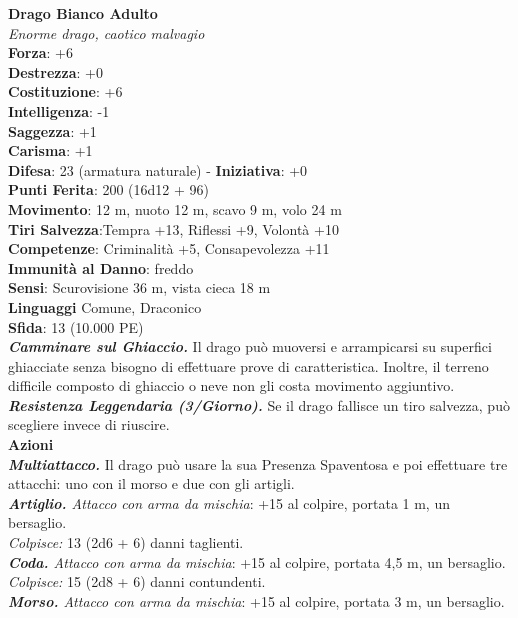 \begin{multicols}{2}
\medskip\textbf{Drago Bianco Adulto}\\
\emph{Enorme drago, caotico malvagio}\\
\textbf{Forza}: +6\\
\textbf{Destrezza}: +0\\
\textbf{Costituzione}: +6\\
\textbf{Intelligenza}: -1\\
\textbf{Saggezza}: +1\\
\textbf{Carisma}: +1\\
\textbf{Difesa}: 23 (armatura naturale) - \textbf{Iniziativa}: +0\\
\textbf{Punti Ferita}: 200 (16d12 + 96)\\
\textbf{Movimento}: 12 m, nuoto 12 m, scavo 9 m, volo 24 m\\
\textbf{Tiri Salvezza}:Tempra +13, Riflessi +9, Volontà +10\\
\textbf{Competenze}: Criminalità +5, Consapevolezza +11\\
\textbf{Immunità al Danno}: freddo\\
\textbf{Sensi}: Scurovisione 36 m, vista cieca 18 m\\
\textbf{Linguaggi} Comune, Draconico\\
\textbf{Sfida}: 13 (10.000 PE)\smallskip\\
\emph{\textbf{Camminare sul Ghiaccio.}} Il drago può muoversi e arrampicarsi su superfici ghiacciate senza bisogno di effettuare prove di caratteristica. Inoltre, il terreno difficile composto di ghiaccio o neve non gli costa movimento aggiuntivo.\\
\emph{\textbf{Resistenza Leggendaria (3/Giorno).}} Se il drago fallisce un tiro salvezza, può scegliere invece di riuscire.\\
\smallskip\textbf{Azioni}\\
\emph{\textbf{Multiattacco.}} Il drago può usare la sua Presenza Spaventosa e poi effettuare tre attacchi: uno con il morso e due con gli artigli.\\
\emph{\textbf{Artiglio.} Attacco con arma da mischia}: +15 al colpire, portata 1 m, un bersaglio.\\
\emph{Colpisce:} 13 (2d6 + 6) danni taglienti.\\
\emph{\textbf{Coda.} Attacco con arma da mischia}: +15 al colpire, portata 4,5 m, un bersaglio.\\
\emph{Colpisce:} 15 (2d8 + 6) danni contundenti.\\
\emph{\textbf{Morso.} Attacco con arma da mischia}: +15 al colpire, portata 3 m, un bersaglio.\\

\end{multicols}
